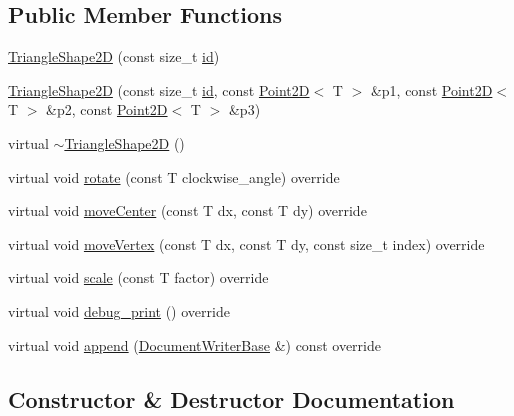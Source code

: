 \subsection*{Public Member Functions}
\begin{DoxyCompactItemize}
\item 
\hyperlink{classGraphicalEditorCore_1_1TriangleShape2D_af0339a667c63abd464603bf68e8d4770}{Triangle\+Shape2D} (const size\+\_\+t \hyperlink{classGraphicalEditorCore_1_1BaseShape2D_ac66cfa23289ae36d70ff6b7c41dd791f}{id})
\item 
\hyperlink{classGraphicalEditorCore_1_1TriangleShape2D_a8769846974cfce9f252ba9c1915ecc17}{Triangle\+Shape2D} (const size\+\_\+t \hyperlink{classGraphicalEditorCore_1_1BaseShape2D_ac66cfa23289ae36d70ff6b7c41dd791f}{id}, const \hyperlink{classGraphicalEditorCore_1_1Point2D}{Point2D}$<$ T $>$ \&p1, const \hyperlink{classGraphicalEditorCore_1_1Point2D}{Point2D}$<$ T $>$ \&p2, const \hyperlink{classGraphicalEditorCore_1_1Point2D}{Point2D}$<$ T $>$ \&p3)
\item 
virtual \hyperlink{classGraphicalEditorCore_1_1TriangleShape2D_a561fbaff5077e2d945eb8a9a95c48617}{$\sim$\+Triangle\+Shape2D} ()
\item 
virtual void \hyperlink{classGraphicalEditorCore_1_1TriangleShape2D_a70baf8d77cdaa6107cac5ba2c8f9bc5b}{rotate} (const T clockwise\+\_\+angle) override
\item 
virtual void \hyperlink{classGraphicalEditorCore_1_1TriangleShape2D_a2b84784e80b932ef32641e7ac7d41bee}{move\+Center} (const T dx, const T dy) override
\item 
virtual void \hyperlink{classGraphicalEditorCore_1_1TriangleShape2D_a904d1d62d033013b636062c38df68d29}{move\+Vertex} (const T dx, const T dy, const size\+\_\+t index) override
\item 
virtual void \hyperlink{classGraphicalEditorCore_1_1TriangleShape2D_a769d7053c7410e288abeaa8e6122ee26}{scale} (const T factor) override
\item 
virtual void \hyperlink{classGraphicalEditorCore_1_1TriangleShape2D_a056f50df5a3891dba4c7ee46593ee5b4}{debug\+\_\+print} () override
\item 
virtual void \hyperlink{classGraphicalEditorCore_1_1TriangleShape2D_af743a9e43c2f30d9b76dd4c37fe475c0}{append} (\hyperlink{classGraphicalEditorCore_1_1DocumentWriterBase}{Document\+Writer\+Base} \&) const override
\end{DoxyCompactItemize}


\subsection{Constructor \& Destructor Documentation}
